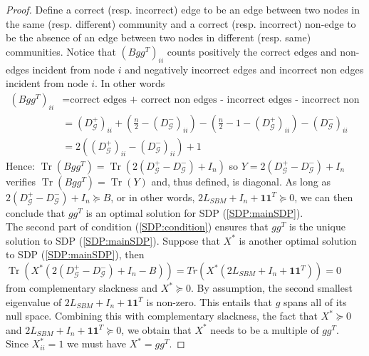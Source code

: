 \documentclass[english]{article}
\newcommand{\1}{\textbf{1}}
\newcommand{\Dp}{D_{\mathcal{G}}^+}
\newcommand{\Dm}{D_{\mathcal{G}}^-}
\newcommand{\tr}{\operatorname{Tr}}
\begin{document}
\begin{proof}
Define a correct (resp. incorrect) edge to be an edge between two nodes in the same (resp. different) community and a correct (resp. incorrect) non-edge to be the absence of an edge between two nodes in different (resp. same) communities. Notice that $(Bgg^T)_{ii}$ counts positively the correct edges and non-edges incident from node $i$ and negatively incorrect edges and incorrect non edges incident from node $i$. In other words
\begin{align}
(Bgg^T)_{ii} &= \text{correct edges + correct non edges - incorrect edges - incorrect non edges}\\
&= (\Dp)_{ii}+\left(\frac{n}{2}-(\Dm)_{ii}\right) - \left(\frac{n}{2}-1-(\Dp)_{ii}\right) - (\Dm)_{ii}\\
&=2\left((\Dp)_{ii}-(\Dm)_{ii}\right)+1
\end{align}
Hence: $\tr\left(Bgg^T\right)=\tr\left(2\left(\Dp-\Dm\right)+I_n\right)$ so $Y=2\left(\Dp-\Dm\right)+I_n$ verifies $\tr(Bgg^T)=\tr(Y)$ and, thus defined, is diagonal. As long as $2\left(\Dp-\Dm\right)+I_n \succeq B$, or in other words, $2L_{SBM} +I_n + \1\1^T \succeq 0$, we can then conclude that $gg^T$ is an optimal solution for SDP (\ref{SDP:mainSDP}). \\

The second part of condition (\ref{SDP:condition}) ensures that $gg^T$ is the unique solution to SDP (\ref{SDP:mainSDP}). Suppose that $X^*$ is another optimal solution to SDP (\ref{SDP:mainSDP}), then $\tr\left(X^*\left(2\left(\Dp-\Dm\right)+I_n-B\right)\right)=Tr \left( X^*\left(2L_{SBM} +I_n + \1\1^T\right)\right)=0$ from complementary slackness and $X^* \succeq 0$.  By assumption, the second smallest eigenvalue of  $2L_{SBM} +I_n + \1\1^T$ is non-zero. This entails that $g$ spans all of its null space. Combining this with complementary slackness, the fact that $X^* \succeq 0$ and $2L_{SBM} +I_n + \1\1^T \succeq 0$, we obtain that $X^*$ needs to be a multiple of $gg^T$. Since $X^*_{ii}=1$ we must have $X^*=gg^T$.
\end{proof}
\end{document}
